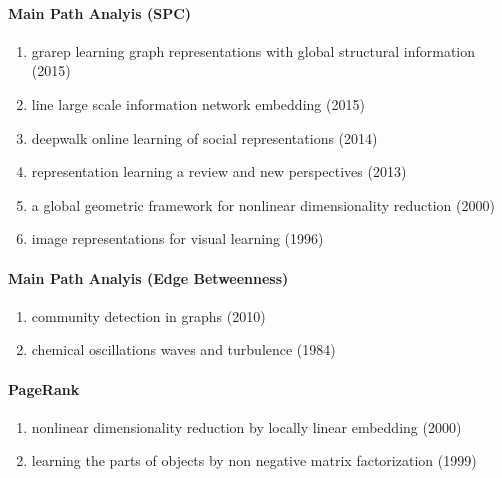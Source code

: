 \documentclass[lettepaper,]{article}
\providecommand{\tightlist}{%
  \setlength{\itemsep}{0pt}\setlength{\parskip}{0pt}}
\let\oldparagraph\paragraph
\renewcommand{\paragraph}[1]{\oldparagraph{#1}\mbox{}}
\begin{document}
\hypertarget{main-path-analyis-spc}{%
\paragraph{Main Path Analyis (SPC)}\label{main-path-analyis-spc}}

\begin{enumerate}
\def\labelenumi{\arabic{enumi}.}
\tightlist
\item
  grarep learning graph representations with global structural
  information (2015)
\item
  line large scale information network embedding (2015)
\item
  deepwalk online learning of social representations (2014)
\item
  representation learning a review and new perspectives (2013)
\item
  a global geometric framework for nonlinear dimensionality reduction
  (2000)
\item
  image representations for visual learning (1996)
\end{enumerate}

\hypertarget{main-path-analyis-edge-betweenness}{%
\paragraph{Main Path Analyis (Edge
Betweenness)}\label{main-path-analyis-edge-betweenness}}

\begin{enumerate}
\def\labelenumi{\arabic{enumi}.}
\tightlist
\item
  community detection in graphs (2010)
\item
  chemical oscillations waves and turbulence (1984)
\end{enumerate}

\hypertarget{pagerank-1}{%
\paragraph{PageRank}\label{pagerank-1}}

\begin{enumerate}
\def\labelenumi{\arabic{enumi}.}
\tightlist
\item
  nonlinear dimensionality reduction by locally linear embedding (2000)
\item
  learning the parts of objects by non negative matrix factorization
  (1999)
\end{enumerate}
\end{document}
